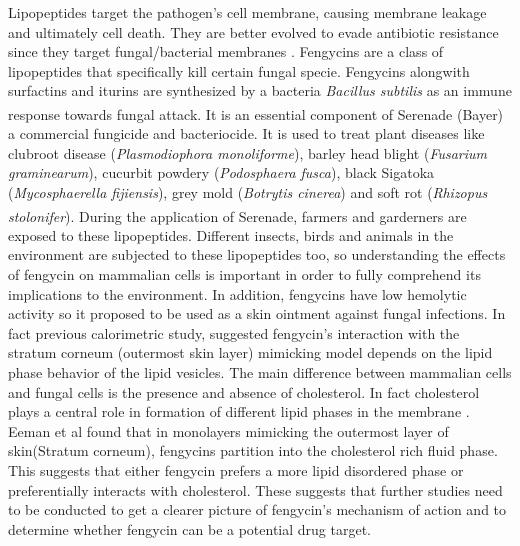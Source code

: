 Lipopeptides target the pathogen's cell membrane, causing membrane leakage and ultimately cell death. They are 
better evolved to evade antibiotic resistance since they target fungal/bacterial membranes \cite{Hancock2006}.
Fengycins are a class of lipopeptides that specifically kill certain fungal specie. \cite{Jacques2008, Thonart2005} Fengycins alongwith surfactins and iturins are synthesized by a bacteria \textit{Bacillus subtilis} as an immune response towards fungal attack\cite{Jung1986, RomeroPerez2007}. It is an essential component of Serenade\textsuperscript{\textregistered} (Bayer) a commercial fungicide and bacteriocide.
It is used to treat plant diseases like clubroot disease (\textit{Plasmodiophora monoliforme}), 
barley head blight (\textit{Fusarium graminearum}), cucurbit powdery (\textit{Podosphaera 
fusca}), black Sigatoka (\textit{Mycosphaerella fijiensis}), grey mold (\textit{Botrytis 
cinerea}) and soft rot (\textit{Rhizopus stolonifer})\cite{Long2013, Yang2007, 
Seguin2009,RomeroPerez2007, Thonart2004, Lu2011, Seddon1998, Yu2008, Allan2002, Lu2011, Bie2011}. 
During the application of Serenade\textsuperscript{\textregistered}, farmers and garderners are exposed to these lipopeptides. 
Different insects, birds and animals in the environment are subjected to these lipopeptides too, so understanding
the effects of fengycin on mammalian cells is important in order to fully comprehend its implications to 
the environment.
In addition, fengycins have low hemolytic activity so it proposed to be used as a skin ointment against fungal 
infections\cite{Jung1986, Jacques1999, Dufrene2005}. In fact previous calorimetric study, suggested fengycin's 
interaction with the stratum corneum (outermost skin layer) mimicking model depends on the lipid phase behavior of 
the lipid vesicles\cite{Eeman2014}.
The main difference between mammalian cells and fungal cells is the presence and absence of cholesterol. In fact 
cholesterol plays a central role in formation of different lipid phases in the membrane \cite{Barenholz2002}.
Eeman et al found that in monolayers mimicking the outermost layer of skin(Stratum corneum), 
fengycins partition into the cholesterol rich fluid phase. \cite{EemanDeleu2009} This suggests that either fengycin 
prefers a more lipid disordered phase or preferentially interacts with cholesterol.
These suggests that further studies need to be conducted to get a clearer picture of fengycin's mechanism
of action and to determine whether fengycin can be a potential drug target.

